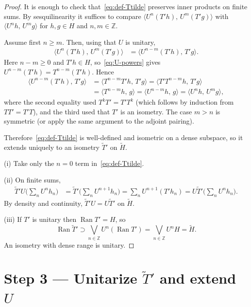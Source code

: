 \documentclass[11pt]{article}
\begin{document}
\begin{proof}
It is enough to check that~\eqref{eq:def-Ttilde} preserves inner products on
finite sums. By sesquilinearity it suffices to compare
\(\langle U^n(T'h),\,U^m(T'g)\rangle\) with \(\langle U^n h,\,U^m g\rangle\) for
\(h,g\in H\) and \(n,m\in\mathbb{Z}\).

Assume first \(n\ge m\). Then, using that \(U\) is unitary,
\begin{align*}
\bigl\langle U^n(T'h),\,U^m(T'g)\bigr\rangle
&=
\bigl\langle U^{n-m}(T'h),\,T'g\bigr\rangle.
\end{align*}
Here \(n-m\ge 0\) and \(T'h\in H\), so~\eqref{eq:U-powers} gives
\(U^{n-m}(T'h)=T^{n-m}(T'h)\). Hence
\begin{align*}
\bigl\langle U^{n-m}(T'h),\,T'g\bigr\rangle
&=
\bigl\langle T^{n-m}T'h,\,T'g\bigr\rangle
=
\bigl\langle T'T^{n-m}h,\,T'g\bigr\rangle
\\
&=
\bigl\langle T^{n-m}h,\,g\bigr\rangle
=
\bigl\langle U^{n-m}h,\,g\bigr\rangle
=
\bigl\langle U^n h,\,U^m g\bigr\rangle,
\end{align*}
where the second equality used \(T^kT'=T'T^k\) (which follows by induction from
\(TT'=T'T\)), and the third used that \(T'\) is an isometry. The case \(m>n\) is
symmetric (or apply the same argument to the adjoint pairing).

Therefore~\eqref{eq:def-Ttilde} is well-defined and isometric on a dense
subspace, so it extends uniquely to an isometry \(\widetilde{T}'\) on
\(\widetilde{H}\).

(i) Take only the \(n=0\) term in~\eqref{eq:def-Ttilde}.

(ii) On finite sums,
\begin{align*}
\widetilde{T}'U\Biggl(\sum_n U^n h_n\Biggr)
&=
\widetilde{T}'\Biggl(\sum_n U^{n+1}h_n\Biggr)
=
\sum_n U^{n+1}(T'h_n)
=
U\widetilde{T}'\Biggl(\sum_n U^n h_n\Biggr).
\end{align*}
By density and continuity, \(\widetilde{T}'U=U\widetilde{T}'\) on
\(\widetilde{H}\).

(iii) If \(T'\) is unitary then \(\operatorname{Ran}T'=H\), so
\[
\operatorname{Ran}\widetilde{T}'
\supset
\bigvee_{n\in\mathbb{Z}}U^n(\operatorname{Ran}T')
=
\bigvee_{n\in\mathbb{Z}}U^n H
=
\widetilde{H}.
\]
An isometry with dense range is unitary.
\end{proof}

\bigskip
\section*{Step 3 --- Unitarize \(\widetilde{T}'\) and extend \(U\)}
\end{document}
